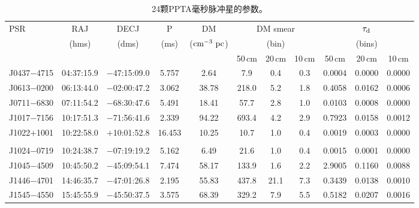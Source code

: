 \begin{landscape}
\begin{table}
\caption{24颗PPTA毫秒脉冲星的参数。}
\label{psr}
\begin{center}
\begin{tabular}{lcccccccccc}
\hline
PSR                  &  RAJ      &  DECJ    &   P     &       DM               &     \multicolumn{3}{c}{DM smear}   &   \multicolumn{3}{c}{$\tau_{\rm{d}}$}       \\
                     &  (hms)    &  (dms)   &  (ms)   &  ($\rm{cm^{-3}\ pc}$)  &     \multicolumn{3}{c}{(bin)}      &   \multicolumn{3}{c}{(bins)}                \\
			               &           &          &         &                        &  50\,cm  & 20\,cm  & 10\,cm        & 50\,cm  &     20\,cm      & 10\,cm          \\
\hline
J0437$-$4715& 04:37:15.9  &  $-$47:15:09.0 &  5.757  &  2.64     & 7.9      & 0.4       & 0.3    &  0.0004  &  0.0000  &  0.0000  \\ 
J0613$-$0200& 06:13:44.0  &  $-$02:00:47.2 &  3.062  &  38.78    & 218.0    & 5.2       & 1.8    &  0.4058  &  0.0162  &  0.0006  \\ 
J0711$-$6830& 07:11:54.2  &  $-$68:30:47.6 &  5.491  &  18.41    & 57.7     & 2.8       & 1.0    &  0.0103  &  0.0008  &  0.0000  \\ 
J1017$-$7156& 10:17:51.3  &  $-$71:56:41.6 &  2.339  &  94.22    & 693.4    & 4.2       & 2.9    &  0.7923  &  0.0158  &  0.0012  \\ 
J1022$+$1001& 10:22:58.0  &  $+$10:01:52.8 &  16.453 &  10.25    & 10.7     & 1.0       & 0.4    &  0.0019  &  0.0003  &  0.0000  \\ 
            &             &                &         &           &          &           &        &          &          &          \\ 
J1024$-$0719& 10:24:38.7  &  $-$07:19:19.2 &  5.162  &  6.49     & 21.6     & 1.0       & 0.4    &  0.0015  &  0.0001  &  0.0000  \\ 
J1045$-$4509& 10:45:50.2  &  $-$45:09:54.1 &  7.474  &  58.17    & 133.9    & 1.6       & 2.2    &  2.9005  &  0.1160  &  0.0088  \\ 
J1446$-$4701& 14:46:35.7  &  $-$47:01:26.8 &  2.195  &  55.83    & 437.8    & 21.1      & 7.3    &  0.3439  &  0.0138  &  0.0010  \\ 
J1545$-$4550& 15:45:55.9  &  $-$45:50:37.5 &  3.575  &  68.39    & 329.2    & 7.9       & 5.5    &  0.5182  &  0.0207  &  0.0016  \\ 

\end{tabular}
\end{center}
\end{table}
\end{landscape}
